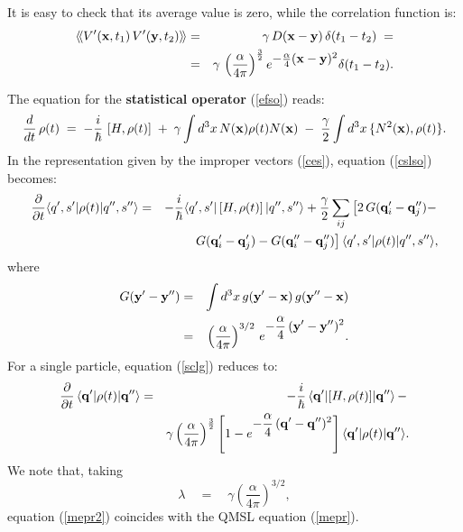 \documentclass[10pt,a4paper]{article}
\newcommand{\llangle}{\langle\!\langle}
\newcommand{\rrangle}{\rangle\!\rangle}
\begin{document}
It is easy to check that its average value is zero, while the
correlation function is:
\begin{eqnarray} \label{fcrov}
\llangle V'({\bf x}, t_{1})\, V'({\bf y}, t_{2}) \rrangle & = &
\gamma\, D({\bf x} - {\bf y}) \, \delta(t_{1} - t_{2})
\; = \nonumber \\
& = & \gamma\, \left(\frac{\alpha}{4\pi}\right)^{\frac{3}{2}}
e^{\makebox{$-\frac{\alpha}{4}({\bf x} - {\bf y})^{2}$}}
\delta(t_{1} - t_{2}).
\end{eqnarray}

The equation  for the {\bf statistical operator} (\ref{efso})
reads:
\begin{equation} \label{cslso}
\frac{d}{dt}\, \rho(t) \; = \; - \frac{i}{\hbar}\, \left[ H,
\rho(t) \right] \; + \; \gamma \int d^3 x \, N({\bf x}) \rho(t)
N({\bf x}) \; - \; \frac{\gamma}{2}  \int d^3 x \, \{ N^{2}({\bf
x}) , \rho(t) \}.
\end{equation}
In the representation given by the improper vectors (\ref{ces}),
equation (\ref{cslso}) becomes:
\begin{eqnarray} \label{sclg}
\frac{\partial}{\partial t} \langle q', s'| \rho(t) | q'', s''
\rangle & = & - \frac{i}{\hbar} \langle q', s' | \left[ H, \rho(t)
\right]  | q'', s'' \rangle \nonumber + \frac{\gamma}{2} \sum
_{ij} \left[ 2\,
G({\bf q}_{i}' - {\bf q}_{j}'') - \right. \nonumber \\
& & \left. G({\bf q}_{i}' - {\bf q}_{j}') - G({\bf q}_{i}'' - {\bf
q}_{j}'') \right] \langle q' ,s' | \rho(t) | q'', s'' \rangle,
\end{eqnarray}
where
\begin{eqnarray}
G({\bf y}' - {\bf y}'') & = & \int d^{3} x \, g({\bf y}' - {\bf
x})\, g({\bf y}'' - {\bf x}) \nonumber \\ & = & \left(
\frac{\alpha}{4\pi} \right)^{3/2}\, e^{\displaystyle -
\frac{\alpha}{4}\, ({\bf y}' - {\bf y}'')^{2}}.
\end{eqnarray}
For a single particle, equation (\ref{sclg}) reduces to:
\begin{eqnarray} \label{mepr2}
\frac{\partial}{\partial t}\, \langle{\bf q}'|\rho(t)|{\bf
q}''\rangle & = & - \frac{i}{\hbar}\, \langle{\bf q}'|[H, \rho(t)
]|{\bf q}''\rangle \, - \, \nonumber \\ & &
\gamma\left(\frac{\alpha}{4\pi}\right)^{\frac{3}{2}} \left[ 1 -
e^{\displaystyle - \frac{\alpha}{4}\, ({\bf q}' - {\bf q}'')^{2}}
\right] \langle{\bf q}'|\rho(t)|{\bf q}''\rangle.
\end{eqnarray}
We note that, taking
\begin{equation} \label{rrde}
\lambda \quad = \quad \gamma
\left(\frac{\alpha}{4\pi}\right)^{3/2},
\end{equation}
equation (\ref{mepr2}) coincides with the QMSL equation
(\ref{mepr}).
\end{document}
